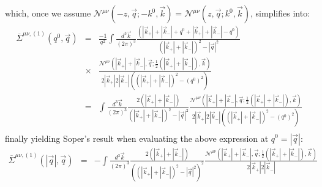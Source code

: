 \documentclass[11pt]{article}
\begin{document}
which, once we assume $\mathcal{N}^{\mu\nu} \left(  -z, \vec{q} ; -k^0, \vec{k} \right)=\mathcal{N}^{\mu\nu} \left(  z, \vec{q} ; k^0, \vec{k} \right)$, simplifies into:
\begin{eqnarray}
\overline{\Sigma}^{\mu\nu,(1)}(q^0, \vec{q}) &=& \frac{ -1 }{ q^2}  \int \frac{ d^3 \vec{k}}{(2\pi)^3} \frac{
\left( |\vec{k}_{+}|+|\vec{k}_{-}| + q^0 + |\vec{k}_{+}|+|\vec{k}_{-}| - q^0 \right)
 } {\left( |\vec{k}_{+}|+|\vec{k}_{-}| \right)^2-|\vec{q}|^2}  \nonumber \\
&\times& \frac{ \mathcal{N}^{\mu\nu} \left(  |\vec{k}_{+}|+|\vec{k}_{-}| , \vec{q} ; \frac{1}{2}(|\vec{k}_{+}|+|\vec{k}_{-}|), \vec{k} \right) }{ 2|\vec{k}_{+}|2|\vec{k}_{-}|\left(\left( |\vec{k}_{+}|+|\vec{k}_{-}| \right)^2-(q^0)^2\right) }
 \nonumber\\
 &=&  \int \frac{ d^3 \vec{k}}{(2\pi)^3} \frac{
2 \left( |\vec{k}_{+}|+|\vec{k}_{-}| \right)
 } {\left( |\vec{k}_{+}|+|\vec{k}_{-}| \right)^2-|\vec{q}|^2} 
\frac{ \mathcal{N}^{\mu\nu} \left(  |\vec{k}_{+}|+|\vec{k}_{-}| , \vec{q} ; \frac{1}{2}(|\vec{k}_{+}|+|\vec{k}_{-}|), \vec{k} \right) }{ 2|\vec{k}_{+}|2|\vec{k}_{-}|\left(\left( |\vec{k}_{+}|+|\vec{k}_{-}| \right)^2-(q^0)^2\right) } \nonumber \\
\end{eqnarray}
finally yielding Soper's result when evaluating the above expression at $q^0=|\vec{q}|$:
\begin{eqnarray}
\overline{\Sigma}^{\mu\nu,(1)}(|\vec{q}|, \vec{q}) &=&
-\int \frac{ d^3 \vec{k}}{(2\pi)^3} \frac{
2 \left( |\vec{k}_{+}|+|\vec{k}_{-}| \right)
 } {\left(\left( |\vec{k}_{+}|+|\vec{k}_{-}| \right)^2-|\vec{q}|^2\right)^2} 
\frac{ \mathcal{N}^{\mu\nu} \left(  |\vec{k}_{+}|+|\vec{k}_{-}| , \vec{q} ; \frac{1}{2}(|\vec{k}_{+}|+|\vec{k}_{-}|), \vec{k} \right) }{ 2|\vec{k}_{+}|2|\vec{k}_{-}| }\nonumber\\
\end{eqnarray}
\end{document}
